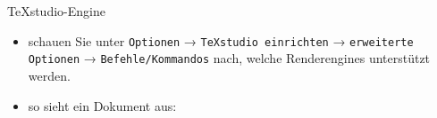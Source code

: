 \begin{frame}[fragile]{TeXstudio-Engine}
    \begin{itemize}
        \itemsep1pt\parskip0pt
        \item schauen Sie unter  \texttt{Optionen} → \texttt{TeXstudio einrichten} → \texttt{erweiterte Optionen} → \texttt{Befehle/Kommandos} nach, welche Renderengines unterstützt werden.
        \item so sieht ein \XeLaTeX Dokument aus:
    \end{itemize}
\end{frame}
